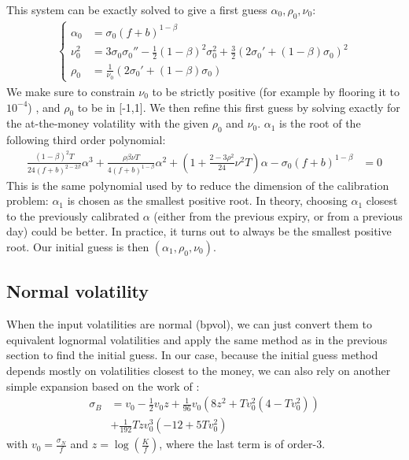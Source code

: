 \documentclass[]{rAMF2e}
\begin{document}
This system can be exactly solved to give a first guess $\alpha_0, \rho_0,\nu_0$:
\begin{align}
  \begin{cases}
\alpha_0 &=  \sigma_0 (f+b)^{1-\beta}\\
\nu_0^2 &= 3\sigma_0\sigma_0''-\frac{1}{2}(1-\beta)^2\sigma_0^2+\frac{3}{2}\left(2\sigma_0'+(1-\beta)\sigma_0\right)^2 \\
\rho_0 &= \frac{1}{\nu_0}\left(2\sigma_0'+(1-\beta)\sigma_0\right) 
\end{cases} 
\end{align}
We make sure to constrain $\nu_0$ to be strictly positive (for example by flooring it to $10^{-4}$) , and $\rho_0$ to be in [-1,1]. We then refine this first guess by solving exactly for the at-the-money volatility with the given $\rho_0$ and $\nu_0$. $\alpha_1$ is the root of the following third order polynomial:
\begin{align}
\frac{(1-\beta)^2 T}{24 (f+b)^{2-2\beta}}\alpha^3+ \frac{\rho\beta\nu T}{4(f+b)^{1-\beta}}\alpha^2 + \left(1+\frac{2-3\rho^2}{24}\nu^2 T\right)\alpha - \sigma_0 (f+b)^{1-\beta} &= 0
\end{align}
This is the same polynomial used by \citet{west2005calibration} to reduce the dimension of the calibration problem: $\alpha_1$ is chosen as the smallest positive root. In theory, choosing $\alpha_1$ closest to the previously calibrated $\alpha$ (either from the previous expiry, or from a previous day) could be better. In practice, it turns out to always be the smallest positive root. 
Our initial guess is then $(\alpha_1, \rho_0, \nu_0)$.
\subsection{Normal volatility}
When the input volatilities are normal (bpvol), we can just convert them to equivalent lognormal volatilities and apply the same method as in the previous section to find the initial guess. In our case, because the initial guess method depends mostly on volatilities closest to the money, we can also rely on another simple expansion based on the work of \citep{lorig2014implied}:
\begin{align}
\sigma_B &= v_0 - \frac{1}{2}v_0 z + \frac{1}{96}v_0(8z^2+T v_0^2 (4-T v_0^2)) \nonumber \\
         &+ \frac{1}{192}T z v_0^3 (-12+5T v_0^2)
\end{align}
with $v_0 = \frac{\sigma_N}{f}$ and $z=\log(\frac{K}{f})$, where the last term is of order-3.
\end{document}
